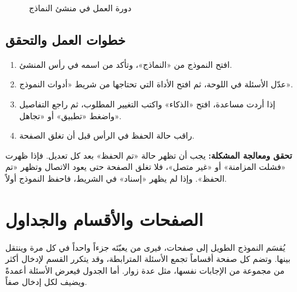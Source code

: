 \begin{figure}[H]
\centering
{}
\rclegend
\caption{دورة العمل في منشئ النماذج}
\label{fig:builder-forms-builder-flow}
\end{figure}

\subsection{خطوات العمل والتحقق}
\begin{enumerate}
\item افتح النموذج من «النماذج»، وتأكد من اسمه في رأس المنشئ.
\item عدّل الأسئلة في اللوحة، ثم افتح الأداة التي تحتاجها من شريط «أدوات النموذج».
\item إذا أردت مساعدة، افتح «الذكاء» واكتب التغيير المطلوب، ثم راجع التفاصيل واضغط «تطبيق» أو «تجاهل».
\item راقب حالة الحفظ في الرأس قبل أن تغلق الصفحة.
\end{enumerate}

\textbf{تحقق ومعالجة المشكلة:} يجب أن تظهر حالة «تم الحفظ» بعد كل تعديل. فإذا ظهرت «فشلت المزامنة» أو «غير متصل»، فلا تغلق الصفحة حتى يعود الاتصال وتظهر «تم الحفظ». وإذا لم يظهر «إسناد» في الشريط، فاحفظ النموذج أولاً.

\clearpage
\section{الصفحات والأقسام والجداول}
\label{sec:builder-feature-forms-pages}

يُقسَم النموذج الطويل إلى صفحات، فيرى من يعبّئه جزءاً واحداً في كل مرة وينتقل بينها. وتضم كل صفحة أقساماً تجمع الأسئلة المترابطة، وقد يتكرر القسم لإدخال أكثر من مجموعة من الإجابات نفسها، مثل عدة زوار. أما الجدول فيعرض الأسئلة أعمدةً ويضيف لكل إدخال صفاً.

